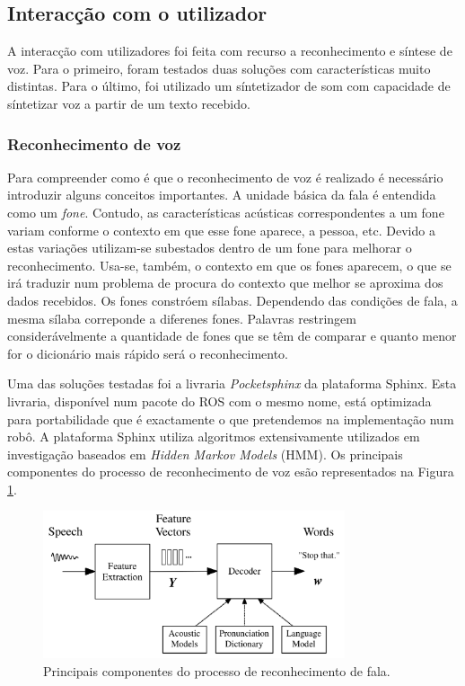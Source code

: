 \documentclass[journal]{IEEEtran}
\begin{document}
\subsection{Interacção com o utilizador}

A interacção com utilizadores foi feita com recurso a reconhecimento e síntese de voz. Para o primeiro, foram testados duas soluções com características muito distintas. Para o último, foi utilizado um síntetizador de som com capacidade de síntetizar voz a partir de um texto recebido.

\subsubsection{Reconhecimento de voz}

Para compreender como é que o reconhecimento de voz é realizado é necessário introduzir alguns conceitos importantes. A unidade básica da fala é entendida como um \emph{fone}. Contudo, as características acústicas correspondentes a um fone variam conforme o contexto em que esse fone aparece, a pessoa, etc. Devido a estas variações  utilizam-se subestados dentro de um fone para melhorar o reconhecimento. Usa-se, também, o contexto em que os fones aparecem, o que se irá traduzir num problema de procura do contexto que melhor se aproxima dos dados recebidos. Os fones constróem sílabas. Dependendo das condições de fala, a mesma sílaba correponde a diferenes fones. Palavras restringem considerávelmente a quantidade de fones que se têm de comparar e quanto menor for o dicionário mais rápido será o reconhecimento.

Uma das soluções testadas foi a livraria \textit{Pocketsphinx} da plataforma Sphinx. Esta livraria, disponível num pacote do ROS com o mesmo nome, está optimizada para portabilidade que é exactamente o que pretendemos na implementação num robô. A plataforma Sphinx utiliza algoritmos extensivamente utilizados em investigação baseados em \textit{Hidden Markov Models} (HMM). Os principais componentes do processo de reconhecimento de voz esão representados na Figura \ref{fig:voicerecprocess}.

\begin{figure}[ht]
  \centering
  \includegraphics[width=21pc]{voice_rec_process.png}
  \caption{Principais componentes do processo de reconhecimento de fala.}
  \label{fig:voicerecprocess}
\end{figure}
\end{document}
